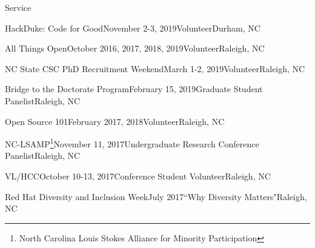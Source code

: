 \documentclass{resume} %
\begin{document}
\begin{rSection}{Service}

\begin{sSubsection}{HackDuke: Code for Good}{November 2-3, 2019}{Volunteer}{Durham, NC}
\end{sSubsection}
\vspace{-5pt}
\begin{sSubsection}{All Things Open}{October 2016, 2017, 2018, 2019}{Volunteer}{Raleigh, NC}
\end{sSubsection}
\vspace{-5pt}
\begin{sSubsection}{NC State CSC PhD Recruitment Weekend}{March 1-2, 2019}{Volunteer}{Raleigh, NC}
\end{sSubsection}
\vspace{-5pt}
\begin{sSubsection}{Bridge to the Doctorate Program}{February 15, 2019}{Graduate Student Panelist}{Raleigh, NC}
\end{sSubsection}
\vspace{-5pt}
\begin{sSubsection}{Open Source 101}{February 2017, 2018}{Volunteer}{Raleigh, NC}
\end{sSubsection}
\vspace{-5pt}
\begin{sSubsection}{NC-LSAMP\footnote{North Carolina Louis Stokes Alliance for Minority Participation}}{November 11, 2017}{Undergraduate Research Conference Panelist}{Raleigh, NC}
\end{sSubsection}
\vspace{-5pt}
\begin{sSubsection}{VL/HCC}{October 10-13, 2017}{Conference Student Volunteer}{Raleigh, NC}
\end{sSubsection}
\vspace{-5pt}
\begin{sSubsection}{Red Hat Diversity and Inclusion Week}{July 2017}{``Why Diversity Matters"}{Raleigh, NC}
\end{sSubsection}
\vspace{-5pt}


\end{rSection}
\end{document}
